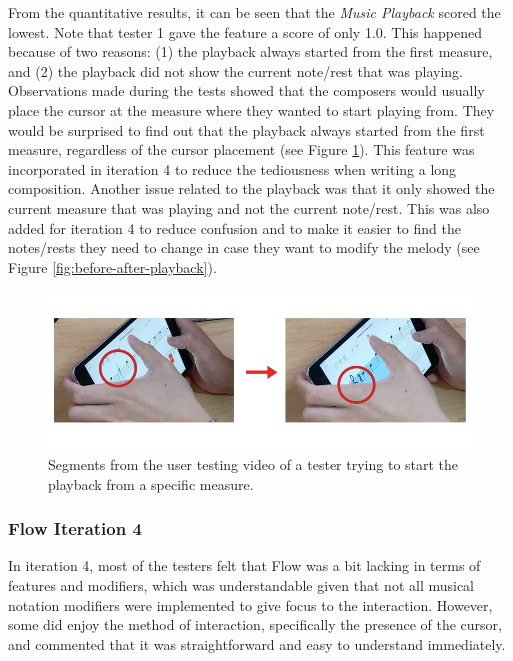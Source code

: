 				From the quantitative results, it can be seen that the \textit{Music Playback} scored the lowest. Note that tester 1 gave the feature a score of only 1.0. This happened because of two reasons: (1) the playback always started from the first measure, and (2) the playback did not show the current note/rest that was playing. Observations made during the tests showed that the composers would usually place the cursor at the measure where they wanted to start playing from. They would be surprised to find out that the playback always started from the first measure, regardless of the cursor placement (see Figure \ref{fig:video_musicplayback}). This feature was incorporated in iteration 4 to reduce the tediousness when writing a long composition. Another issue related to the playback was that it only showed the current measure that was playing and not the current note/rest. This was also added for iteration 4 to reduce confusion and to make it easier to find the notes/rests they need to change in case they want to modify the melody (see Figure \ref{fig:before-after-playback}). 

				\begin{figure}[H]
					\centering
					\includegraphics[scale=0.5]{figures/video_musicplayback.png}
				    \caption{Segments from the user testing video of a tester trying to start the playback from a specific measure.}
				    \label{fig:video_musicplayback}
				\end{figure}

			\subsubsection{Flow Iteration 4} %
			\label{sub:iteration_4}

			In iteration 4, most of the testers felt that Flow was a bit lacking in terms of features and modifiers, which was understandable given that not all musical notation modifiers were implemented to give focus to the interaction. However, some did enjoy the method of interaction, specifically the presence of the cursor, and commented that it was straightforward and easy to understand immediately. 

